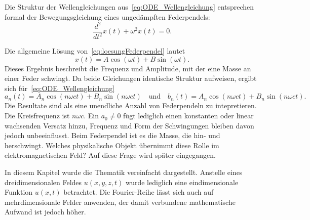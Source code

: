Die Struktur der Wellengleichungen aus~\eqref{eq:ODE_Wellengleichung} entsprechen formal der Bewegungsgleichung eines ungedämpften Federpendels: 
\begin{equation}\label{eq:loesungFederpendel}
	\frac{d^2}{dt^2}x(t) + \omega^2 x(t) = 0.
\end{equation}

Die allgemeine Lösung von~\eqref{eq:loesungFederpendel} lautet  
\begin{equation}
	x(t) = A \cos(\omega t) + B \sin(\omega t).
\end{equation}
Dieses Ergebnis beschreibt die Frequenz und Amplitude, mit der eine Masse an einer Feder schwingt.  
Da beide Gleichungen identische Struktur aufweisen, ergibt sich für~\eqref{eq:ODE_Wellengleichung} 
\begin{equation}
	a_n(t) = A_n \cos(n \omega c t) + B_n \sin(n \omega c t)
	\quad\text{und}\quad
	b_n(t) = A_n \cos(n \omega c t) + B_n \sin(n \omega c t).
\end{equation}
Die Resultate sind als eine unendliche Anzahl von Federpendeln zu intepretieren.
Die Kreisfrequenz ist $n \omega c$. 
Ein $a_0\neq0$ fügt lediglich einen konstanten oder linear wachsenden Versatz hinzu, Frequenz und Form der Schwingungen bleiben davon jedoch unbeeinflusst.
Beim Federpendel ist es die Masse, die hin- und herschwingt.
Welches physikalische Objekt übernimmt diese Rolle im elektromagnetischen Feld? 
Auf diese Frage wird später eingegangen.

In diesem Kapitel wurde die Thematik vereinfacht dargestellt. 
Anstelle eines dreidimensionalen Feldes $u(x,y,z,t)$ wurde lediglich eine eindimensionale Funktion $u(x,t)$ betrachtet. Die Fourier-Reihe lässt sich auch auf mehrdimensionale Felder anwenden, der damit verbundene mathematische Aufwand ist jedoch höher. 








